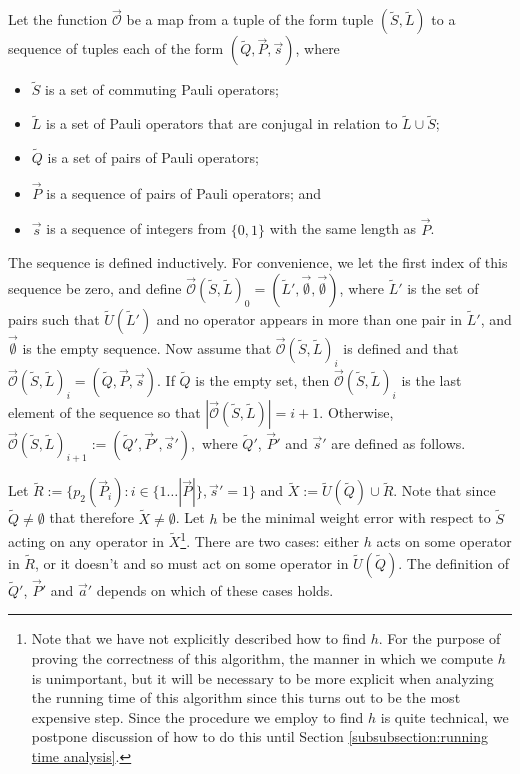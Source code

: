 \documentclass[twocolumn,showpacs,preprintnumbers,amsmath,amssymb,nofootinbib,pra,floatfix]{revtex4-1}
\newenvironment{definition}[1][Definition]{\begin{trivlist}
\item[\hskip \labelsep {\bfseries #1}]}{\end{trivlist}}
\newcommand{\lst}{\vec}
\newcommand{\set}{\tilde}
\newcommand{\optimizer}{\lst{\mathcal{O}}}
\begin{document}
\begin{definition}
Let the function $\optimizer$ be a map from a tuple of the form tuple $(\set S,\set L)$ to a sequence of tuples each of the form $(\set Q,\lst P,\lst s)$, where
\begin{itemize}
\item $\set S$ is a set of commuting Pauli operators;
\item $\set L$ is a set of Pauli operators that are conjugal in relation to $\set L\cup\set S$;
\item $\set Q$ is a set of pairs of Pauli operators;
\item $\lst P$ is a sequence of pairs of Pauli operators; and
\item $\lst s$ is a sequence of integers from $\{0,1\}$ with the same length as $\lst P$.
\end{itemize}

The sequence is defined inductively.  For convenience, we let the first index of this sequence be zero, and define $\optimizer(\set S,\set L)_0=(\set L',\lst\emptyset,\lst\emptyset)$, where $\set L'$ is the set of pairs such that $\set U(\set L')$ and no operator appears in more than one pair in $\set L'$, and $\lst\emptyset$ is the empty sequence.  Now assume that $\optimizer(\set S,\set L)_i$ is defined and that $\optimizer(\set S,\set L)_i=(\set Q,\lst P,\lst s)$.  If $\set Q$ is the empty set, then $\optimizer(\set S,\set L)_i$ is the last element of the sequence so that $|\optimizer(\set S,\set L)|=i+1$.  Otherwise, $\optimizer(\set S,\set L)_{i+1}:=(\set Q',\lst P',\lst s'),$ where $\set Q'$, $\lst P'$ and $\lst s'$ are defined as follows.

Let $\set R:=\{p_2(\lst P_i):i\in\{1\dots |\lst P|\},\lst s'=1\}$ and $\set X:=\set U(\set Q)\cup\set R$.  Note that since $\set Q\ne\emptyset$ that therefore $\set X\ne\emptyset$.  Let $h$ be the minimal weight error with respect to $\set S$ acting on any operator in $\set X$\footnote{Note that we have not explicitly described how to find $h$.  For the purpose of proving the correctness of this algorithm, the manner in which we compute $h$ is unimportant, but it will be necessary to be more explicit when analyzing the running time of this algorithm since this turns out to be the most expensive step.  Since the procedure we employ to find $h$ is quite technical, we postpone discussion of how to do this until Section \ref{subsubsection:running time analysis}.}.  There are two cases: either $h$ acts on some operator in $\set R$, or it doesn't and so must act on some operator in $\set U(\set Q)$.  The definition of $\set Q'$, $\lst P'$ and $\lst a'$ depends on which of these cases holds.


\end{definition}
\end{document}
